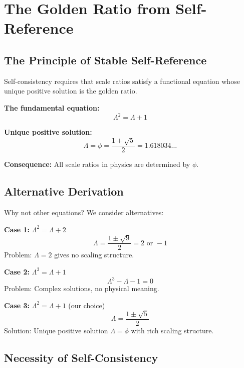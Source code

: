 \documentclass[11pt]{article}
\theoremstyle{definition}
\newcommand{\goldenratio}{\phi}
\begin{document}
\section{The Golden Ratio from Self-Reference}

\subsection{The Principle of Stable Self-Reference}

Self-consistency requires that scale ratios satisfy a functional equation whose unique positive solution is the golden ratio.

\textbf{The fundamental equation:}
\begin{equation}
\Lambda^2 = \Lambda + 1
\end{equation}

\textbf{Unique positive solution:}
\begin{equation}
\Lambda = \goldenratio = \frac{1+\sqrt{5}}{2} = 1.618034\ldots
\end{equation}

\textbf{Consequence:} All scale ratios in physics are determined by $\goldenratio$.

\subsection{Alternative Derivation}

Why not other equations? We consider alternatives:

\textbf{Case 1:} $\Lambda^2 = \Lambda + 2$
\begin{equation}
\Lambda = \frac{1 \pm \sqrt{9}}{2} = 2 \text{ or } -1
\end{equation}
Problem: $\Lambda = 2$ gives no scaling structure.

\textbf{Case 2:} $\Lambda^3 = \Lambda + 1$
\begin{equation}
\Lambda^3 - \Lambda - 1 = 0
\end{equation}
Problem: Complex solutions, no physical meaning.

\textbf{Case 3:} $\Lambda^2 = \Lambda + 1$ (our choice)
\begin{equation}
\Lambda = \frac{1 \pm \sqrt{5}}{2}
\end{equation}
Solution: Unique positive solution $\Lambda = \goldenratio$ with rich scaling structure.

\subsection{Necessity of Self-Consistency}
\end{document}
